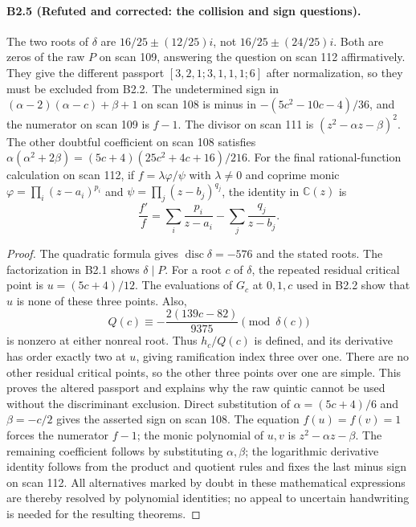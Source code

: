 \paragraph{B2.5 (Refuted and corrected: the collision and sign questions).}
The two roots of $\delta$ are
$16/25\pm(12/25)i$, not $16/25\pm(24/25)i$.
Both are zeros of the raw $P$ on scan 109, answering the question
on scan 112 affirmatively. They give the different passport
$[3,2,1;3,1,1,1;6]$ after normalization, so they must be excluded
from B2.2. The undetermined sign in
$(\alpha-2)(\alpha-c)+\beta+1$ on scan 108 is minus in
$-(5c^2-10c-4)/36$, and the numerator on scan 109 is $f-1$.
The divisor on scan 111 is $(z^2-\alpha z-\beta)^2$.
The other doubtful coefficient on scan 108 satisfies
$\alpha(\alpha^2+2\beta)=(5c+4)(25c^2+4c+16)/216$.
For the final rational-function calculation on scan 112, if
$f=\lambda\varphi/\psi$ with $\lambda\ne0$ and coprime monic
$\varphi=\prod_i(z-a_i)^{p_i}$ and
$\psi=\prod_j(z-b_j)^{q_j}$, the identity in $\mathbb C(z)$ is
\[
 \frac{f'}f=\sum_i\frac{p_i}{z-a_i}-\sum_j\frac{q_j}{z-b_j}.
\]

\begin{proof}
The quadratic formula gives
$\operatorname{disc}\delta=-576$ and the stated roots. The
factorization in B2.1 shows $\delta\mid P$.
For a root $c$ of $\delta$, the repeated residual critical point is
$u=(5c+4)/12$. The evaluations of $G_c$ at $0,1,c$ used in B2.2
show that $u$ is none of these three points. Also,
\[
 Q(c)\equiv-\frac{2(139c-82)}{9375}\pmod{\delta(c)}
\]
is nonzero at either nonreal root. Thus $h_c/Q(c)$ is defined,
and its derivative has order exactly two at $u$, giving ramification
index three over one. There are no other residual critical points,
so the other three points over one are simple. This proves the altered
passport and explains why the raw quintic cannot be used without
the discriminant exclusion. Direct substitution of
$\alpha=(5c+4)/6$ and $\beta=-c/2$ gives the asserted sign on scan
108. The equation $f(u)=f(v)=1$ forces the numerator $f-1$;
the monic polynomial of $u,v$ is $z^2-\alpha z-\beta$.
The remaining coefficient follows by substituting $\alpha,\beta$;
the logarithmic derivative identity follows from the product and
quotient rules and fixes the last minus sign on scan 112.
All alternatives marked by doubt in these mathematical expressions
are thereby resolved by polynomial identities; no appeal to uncertain
handwriting is needed for the resulting theorems.
\end{proof}

